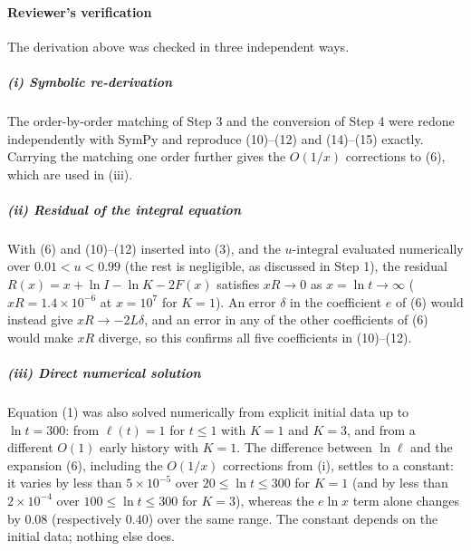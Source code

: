 {\color{blue}
\paragraph*{Reviewer's verification}
The derivation above was checked in three independent ways.

\subparagraph*{(i) Symbolic re-derivation}
The order-by-order matching of Step 3 and the conversion of Step 4 were redone independently with SymPy and reproduce (10)--(12) and (14)--(15) exactly. Carrying the matching one order further gives the $O(1/x)$ corrections to (6), which are used in (iii).

\subparagraph*{(ii) Residual of the integral equation}
With (6) and (10)--(12) inserted into (3), and the $u$-integral evaluated numerically over $0.01<u<0.99$ (the rest is negligible, as discussed in Step 1), the residual $R(x)=x+\ln I-\ln K-2F(x)$ satisfies $xR\to0$ as $x=\ln t\to\infty$ ($xR=1.4\times10^{-6}$ at $x=10^7$ for $K=1$). An error $\delta$ in the coefficient $e$ of (6) would instead give $xR\to-2L\delta$, and an error in any of the other coefficients of (6) would make $xR$ diverge, so this confirms all five coefficients in (10)--(12).

\subparagraph*{(iii) Direct numerical solution}
Equation (1) was also solved numerically from explicit initial data up to $\ln t=300$: from $\ell(t)=1$ for $t\le1$ with $K=1$ and $K=3$, and from a different $O(1)$ early history with $K=1$. The difference between $\ln\ell$ and the expansion (6), including the $O(1/x)$ corrections from (i), settles to a constant: it varies by less than $5\times10^{-5}$ over $20\le\ln t\le300$ for $K=1$ (and by less than $2\times10^{-4}$ over $100\le\ln t\le300$ for $K=3$), whereas the $e\ln x$ term alone changes by $0.08$ (respectively $0.40$) over the same range. The constant depends on the initial data; nothing else does.

}
